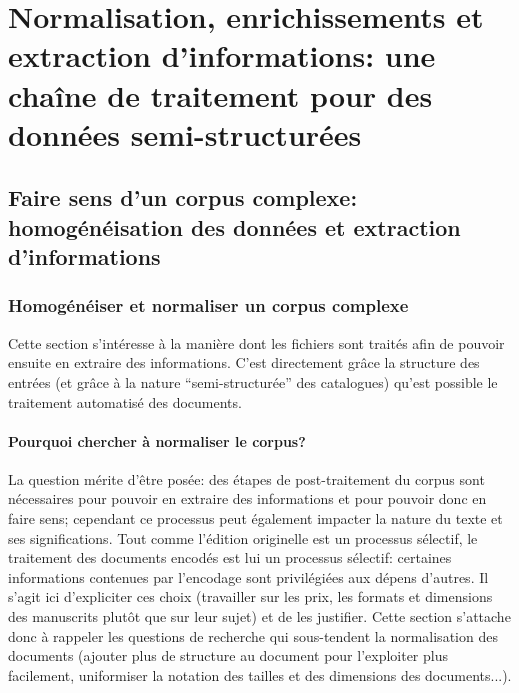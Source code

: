 
\part{Normalisation, enrichissements et extraction d'informations: une chaîne de traitement pour des données semi-structurées}

\chapter{Faire sens d'un corpus complexe: homogénéisation des données et extraction d'informations}

\section{Homogénéiser et normaliser un corpus complexe}
Cette section s'intéresse à la manière dont les fichiers \tei{} sont traités afin de pouvoir ensuite en extraire des informations. C'est directement grâce la structure des entrées (et grâce à la nature \enquote{semi-structurée} des catalogues) qu'est possible le traitement automatisé des documents.

\subsection{Pourquoi chercher à normaliser le corpus?}
La question mérite d'être posée: des étapes de post-traitement du corpus sont nécessaires pour pouvoir en extraire des informations et pour pouvoir donc en faire sens; cependant ce processus peut également impacter la nature du texte et ses significations. Tout comme l'édition \tei{} originelle est un processus sélectif, le traitement des documents encodés est lui un processus sélectif: certaines informations contenues par l'encodage sont privilégiées aux dépens d'autres. Il s'agit ici d'expliciter ces choix (travailler sur les prix, les formats et dimensions des manuscrits plutôt que sur leur sujet) et de les justifier. Cette section s'attache donc à rappeler les questions de recherche qui sous-tendent la normalisation des documents (ajouter plus de structure au document \tei{} pour l'exploiter plus facilement, uniformiser la notation des tailles et des dimensions des documents...).

